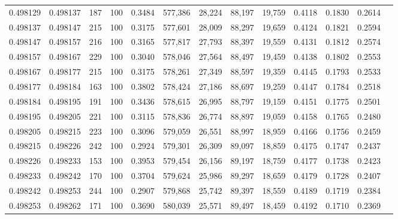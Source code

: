 \begin{tabular}{rrrrrrrrrrrrr}
0.498129 & 0.498137 &   187 & 100 &                                     0.3484 & 577,386 &  28,224 &  88,197 &  19,759 & 0.4118 & 0.1830 & 0.2614 \\
0.498137 & 0.498147 &   215 & 100 &                                     0.3175 & 577,601 &  28,009 &  88,297 &  19,659 & 0.4124 & 0.1821 & 0.2594 \\
0.498147 & 0.498157 &   216 & 100 &                                     0.3165 & 577,817 &  27,793 &  88,397 &  19,559 & 0.4131 & 0.1812 & 0.2574 \\
0.498157 & 0.498167 &   229 & 100 &                                     0.3040 & 578,046 &  27,564 &  88,497 &  19,459 & 0.4138 & 0.1802 & 0.2553 \\
0.498167 & 0.498177 &   215 & 100 &                                     0.3175 & 578,261 &  27,349 &  88,597 &  19,359 & 0.4145 & 0.1793 & 0.2533 \\
0.498177 & 0.498184 &   163 & 100 &                                     0.3802 & 578,424 &  27,186 &  88,697 &  19,259 & 0.4147 & 0.1784 & 0.2518 \\
0.498184 & 0.498195 &   191 & 100 &                                     0.3436 & 578,615 &  26,995 &  88,797 &  19,159 & 0.4151 & 0.1775 & 0.2501 \\
0.498195 & 0.498205 &   221 & 100 &                                     0.3115 & 578,836 &  26,774 &  88,897 &  19,059 & 0.4158 & 0.1765 & 0.2480 \\
0.498205 & 0.498215 &   223 & 100 &                                     0.3096 & 579,059 &  26,551 &  88,997 &  18,959 & 0.4166 & 0.1756 & 0.2459 \\
0.498215 & 0.498226 &   242 & 100 &                                     0.2924 & 579,301 &  26,309 &  89,097 &  18,859 & 0.4175 & 0.1747 & 0.2437 \\
0.498226 & 0.498233 &   153 & 100 &                                     0.3953 & 579,454 &  26,156 &  89,197 &  18,759 & 0.4177 & 0.1738 & 0.2423 \\
0.498233 & 0.498242 &   170 & 100 &                                     0.3704 & 579,624 &  25,986 &  89,297 &  18,659 & 0.4179 & 0.1728 & 0.2407 \\
0.498242 & 0.498253 &   244 & 100 &                                     0.2907 & 579,868 &  25,742 &  89,397 &  18,559 & 0.4189 & 0.1719 & 0.2384 \\
0.498253 & 0.498262 &   171 & 100 &                                     0.3690 & 580,039 &  25,571 &  89,497 &  18,459 & 0.4192 & 0.1710 & 0.2369 \\

\end{tabular}
